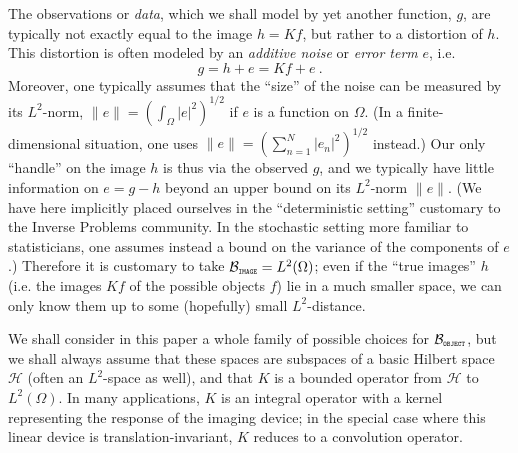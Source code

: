 \documentclass[10pt]{article}
\def\cB{\mathcal{B}}
\def\cH{\mathcal{H}}
\def\OBJ{\mbox{\tiny\texttt{OBJECT}}}
\def\IM{\mbox{\tiny\texttt{IMAGE}}}
\begin{document}
The observations or {\em data}, which we shall model by yet another
function, $g$, are typically not
exactly equal to the image $h=Kf$, but rather to a distortion of $h$. This
distortion
is often modeled by an {\em additive noise} or {\em error term} $e$, i.e.
\begin{equation*}
g=h+e=Kf+e ~.
\end{equation*}
Moreover, one typically assumes that the ``size'' of the noise can be measured
by its $L^2$-norm, $\|e\|=\left( \int_{\Omega} |e|^2\right)^{1/2}$ if $e$
is a function on $\Omega$. (In a finite-dimensional situation, one uses
$\|e\|=
\left(\sum_{n=1}^N |e_n|^2 \right)^{1/2}$ instead.)
Our only ``handle'' on the image $h$ is thus via the observed $g$, and
we typically have little information on $e=g-h$ beyond an upper bound on
its
$L^2$-norm $\|e\|$.
(We have here implicitly placed ourselves
in the ``deterministic setting'' customary to the
Inverse Problems community. In the
stochastic setting more familiar to statisticians, one assumes instead
a bound on the variance
of the components of $e$.)
Therefore it is customary to take
$\cB_{\IM}=L^2(\Omega)$; even if the ``true images'' $h$ (i.e. the images
$Kf$ of the
possible objects $f$) lie in a much smaller space, we can only know them up
to some (hopefully) small $L^2$-distance.

We shall consider in this paper
a whole family of possible choices for $\cB_{\OBJ}$, but we shall
always assume that these spaces are subspaces of a basic Hilbert space
$\cH$ (often
an $L^2$-space as well), and that $K$ is a bounded operator from $\cH$ to
$L^2(\Omega)$.
In many applications, $K$ is an integral operator with a kernel
representing the response of the imaging device; in the special case where
this linear device is
translation-invariant, $K$ reduces to a convolution operator.
\end{document}
